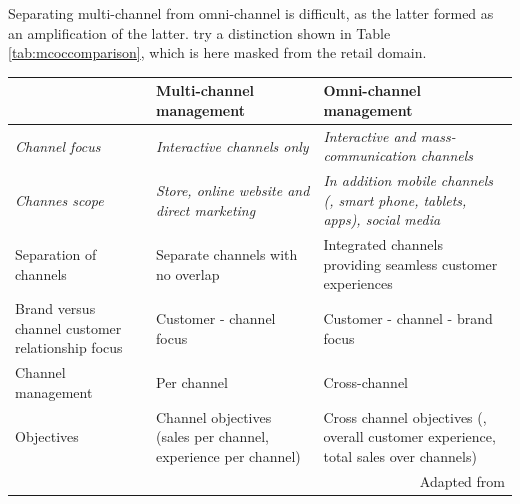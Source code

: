 		Separating multi-channel from omni-channel is difficult, as the latter formed as an amplification of the latter. \cite{vorhoef2015retail} try a distinction shown in Table \ref{tab:mcoccomparison}, which is here masked from the retail domain. 
		
		\begin{table}[caption={Multi- and omni-channel comparison}, label={tab:mcoccomparison}]
			\centering
			\begin{tabular}{p{3cm}| p{5cm} |p{5cm}} 
				& \textbf{Multi-channel management}                                   & \textbf{Omni-channel management}                                                              \\ \hline
				\textit{Channel focus}                         & \textit{Interactive channels only}                                    & \textit{Interactive and mass-communication channels}                                                   \\ \hline
				\textit{Channes scope}                                 & \textit{Store, online website and direct marketing}                          & \textit{In addition mobile channels (\ie, smart phone, tablets, apps), social media}                   \\ \hline
				{Separation of channels}                           & Separate channels with no overlap                                  & Integrated channels providing seamless customer experiences                                   \\ \hline
				{Brand versus channel customer relationship focus} & Customer - channel focus                                            & Customer - channel - brand  focus                                                              \\ \hline
				{Channel management}                               & Per channel                                                         & Cross-channel                                                                                 \\ \hline
				{Objectives}                                       & Channel objectives (\ie sales per channel, experience per channel)& Cross channel objectives (\ie, overall customer experience, total sales over channels) \\
				\multicolumn{3}{r}{Adapted from \citep[\p{176}]{vorhoef2015retail}}
			\end{tabular}
		\end{table}
